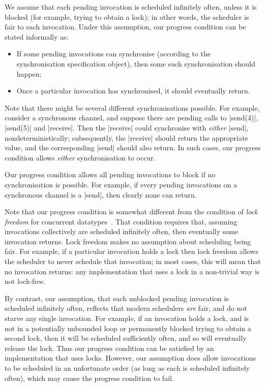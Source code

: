 We assume that each pending invocation is scheduled infinitely often, unless
it is blocked (for example, trying to obtain a lock); in other words, the
scheduler is fair to each invocation.  Under this assumption, our progress
condition can be stated informally as:
%
\begin{itemize}
\item If some pending invocations can synchronise (according to the
  synchronisation specification object), then some such synchronisation should
  happen;

\item Once a particular invocation has synchronised, it should eventually
  return.
\end{itemize}
%
Note that there might be several different synchronisations possible.  For
example, consider a synchronous channel, and suppose there are pending calls
to |send(4)|, |send(5)| and |receive|.  Then the |receive| could synchronise
with \emph{either} |send|, nondeterministically; subsequently, the |receive|
should return the appropriate value, and the corresponding |send| should also
return.  In such cases, our progress condition allows \emph{either}
synchronisation to occur.

Our progress condition allows all pending invocations to block if no
synchronisation is possible.  For example, if every pending invocations on a
synchronous channel is a |send|, then clearly none can return.

Note that our progress condition is somewhat different from the condition of
\emph{lock freedom} for concurrent datatypes~\cite{herlihy-shavit}.  That
condition requires that, assuming invocations collectively are scheduled
infinitely often, then eventually some invocation returns.  Lock freedom makes
no assumption about scheduling being fair.  For example, if a particular
invocation holds a lock then lock freedom allows the scheduler to never
schedule that invocation; in most cases, this will mean that no invocation
returns: any implementation that uses a lock in a non-trivial way is not
lock-free.

By contrast, our assumption, that each unblocked pending invocation is
scheduled infinitely often, reflects that modern schedulers \emph{are} fair,
and do not starve any single invocation.  For example, if an invocation holds
a lock, and is not in a potentially unbounded loop or permanently blocked
trying to obtain a second lock, then it will be scheduled sufficiently often,
and so will eventually release the lock.  Thus our progress condition can be
satisfied by an implementation that uses locks.  However, our assumption does
allow invocations to be scheduled in an unfortunate order (as long as each is
scheduled infinitely often), which may cause the progress condition to fail.

